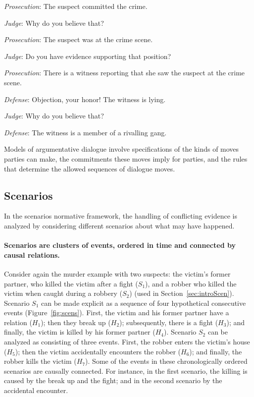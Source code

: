 \documentclass[10pt]{article}
\begin{document}
\begin{description}
	\item \emph{Prosecution}: The suspect committed the crime.
	\item \emph{Judge}: Why do you believe that?
	\item \emph{Prosecution}: The suspect was at the crime scene.
	\item \emph{Judge}: Do you have evidence supporting that position?
	\item \emph{Prosecution}: There is a witness reporting that she saw the suspect at the crime scene.
	\item \emph{Defense}: Objection, your honor! The witness is lying.
	\item \emph{Judge}: Why do you believe that?
	\item \emph{Defense}: The witness is a member of a rivalling gang.
\end{description}

\noindent Models of argumentative dialogue involve specifications of the kinds of moves parties can make, the commitments these moves imply for parties, and the rules that determine the allowed sequences of dialogue moves.

  


\subsection{Scenarios}

In the scenarios normative framework, the handling of conflicting evidence is analyzed by considering different scenarios about what may have happened.

\paragraph{Scenarios are clusters of events, ordered in time and connected by causal relations.} Consider again the murder example with two suspects: the victim's former partner, who killed the victim after a fight ($S_1$), and a robber who killed the victim when caught during a robbery ($S_2$) (used in Section~\ref{sec:introScen}). Scenario $S_1$ can be made explicit as a sequence of four hypothetical consecutive events (Figure~\ref{fig:scens}). First, the victim and his former partner have a relation ($H_1$); then they break up ($H_2$); subsequently, there is a fight ($H_3$); and finally, the victim is killed by his former partner ($H_4$). Scenario $S_2$ can be analyzed as consisting of three events. First, the robber enters the victim's house ($H_5$); then the victim accidentally encounters the robber ($H_6$); and finally, the robber kills the victim ($H_7$). Some of the events in these chronologically ordered scenarios are causally connected. For instance, in the first scenario, the killing is caused by the break up and the fight; and in the second scenario by the accidental encounter.
\end{document}
